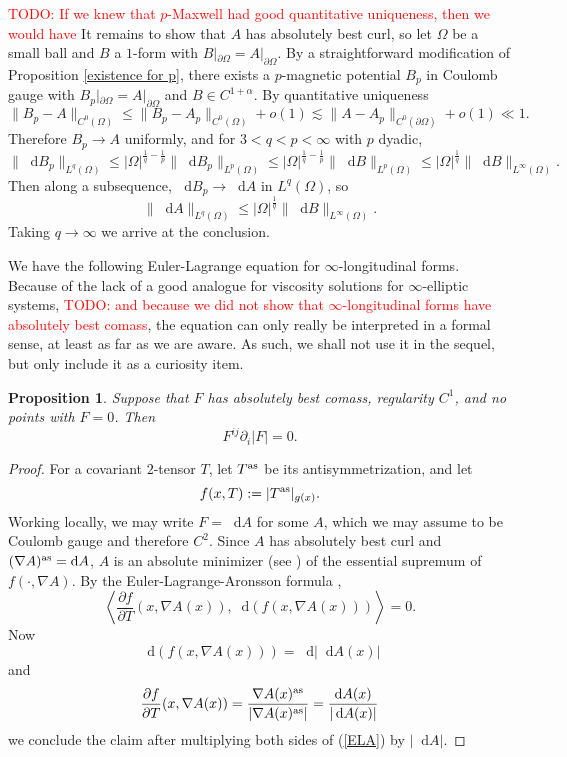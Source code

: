 \documentclass[reqno,11pt]{amsart}
\newcommand*\dif{\mathop{}\!\mathrm{d}}
\newtheorem{proposition}[theorem]{Proposition}
\theoremstyle{definition}
\numberwithin{equation}{section}
\newcommand\todo[1]{\textcolor{red}{TODO: #1}}
\begin{document}
\todo{If we knew that $p$-Maxwell had good quantitative uniqueness, then we would have}
It remains to show that $A$ has absolutely best curl, so let $\Omega$ be a small ball and $B$ a $1$-form with $B|_{\partial \Omega} = A|_{\partial \Omega}$.
By a straightforward modification of Proposition \ref{existence for p}, there exists a $p$-magnetic potential $B_p$ in Coulomb gauge with $B_p|_{\partial \Omega} = A|_{\partial \Omega}$ and $B \in C^{1 + \alpha}$.
By quantitative uniqueness
$$\|B_p - A\|_{C^0(\Omega)} \leq \|B_p - A_p\|_{C^0(\Omega)} + o(1) \lesssim \|A - A_p\|_{C^0(\partial \Omega)} + o(1) \ll 1.$$
Therefore $B_p \to A$ uniformly, and for $3 < q < p < \infty$ with $p$ dyadic,
$$\|\dif B_p\|_{L^q(\Omega)} \leq |\Omega|^{\frac{1}{q} -\frac{1}{p}} \|\dif B_p\|_{L^p(\Omega)} \leq |\Omega|^{\frac{1}{q} -\frac{1}{p}} \|\dif B\|_{L^p(\Omega)} \leq |\Omega|^{\frac{1}{q}} \|\dif B\|_{L^\infty(\Omega)}.$$
Then along a subsequence, $\dif B_p \to \dif A$ in $L^q(\Omega)$, so 
$$\|\dif A\|_{L^q(\Omega)} \leq |\Omega|^{\frac{1}{q}} \|\dif B\|_{L^\infty(\Omega)}.$$
Taking $q \to \infty$ we arrive at the conclusion.

We have the following Euler-Lagrange equation for $\infty$-longitudinal forms.
Because of the lack of a good analogue for viscosity solutions for $\infty$-elliptic systems, \todo{and because we did not show that $\infty$-longitudinal forms have absolutely best comass}, the equation can only really be interpreted in a formal sense, at least as far as we are aware.
As such, we shall not use it in the sequel, but only include it as a curiosity item.

\begin{proposition}
Suppose that $F$ has absolutely best comass, regularity $C^1$, and no points with $F = 0$. Then
\begin{equation}\label{infinityMaxwell}
	F^{ij} \partial_i |F| = 0.
\end{equation}
\end{proposition}
\begin{proof}
For a covariant $2$-tensor $T$, let $T^{\rm as}$ be its antisymmetrization, and let
$$f(x, T) := |T^{\rm as}|_{g(x)}.$$
Working locally, we may write $F = \dif A$ for some $A$, which we may assume to be Coulomb gauge and therefore $C^2$.
Since $A$ has absolutely best curl and $(\nabla A)^{\rm as} = \dif A$, $A$ is an absolute minimizer (see \cite[Definition 5.1]{Barron2001}) of the essential supremum of $f(\cdot, \nabla A)$.
By the Euler-Lagrange-Aronsson formula \cite[Theorem 5.2]{Barron2001},
\begin{equation}\label{ELA}
	\left\langle \frac{\partial f}{\partial T}(x, \nabla A(x)), \dif (f(x, \nabla A(x))) \right\rangle = 0.
\end{equation}
Now
$$\dif(f(x, \nabla A(x))) = \dif |\dif A(x)|$$
and 
$$\frac{\partial f}{\partial T}(x, \nabla A(x)) = \frac{\nabla A(x)^{\rm as}}{|\nabla A(x)^{\rm as}|} = \frac{\dif A(x)}{|\dif A(x)|}$$
we conclude the claim after multiplying both sides of (\ref{ELA}) by $|\dif A|$.
\end{proof}
\end{document}
